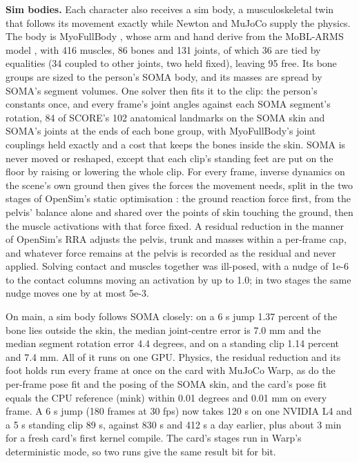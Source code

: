 \textbf{Sim bodies.} Each character also receives a sim body, a musculoskeletal twin that follows its movement exactly while Newton and MuJoCo supply the physics. The body is MyoFullBody \citep{caggiano2022myosuite}, whose arm and hand derive from the MoBL-ARMS model \citep{holzbaur2005upper, saul2015benchmarking}, with 416 muscles, 86 bones and 131 joints, of which 36 are tied by equalities (34 coupled to other joints, two held fixed), leaving 95 free. Its bone groups are sized to the person's SOMA body, and its masses are spread by SOMA's segment volumes. One solver then fits it to the clip: the person's constants once, and every frame's joint angles against each SOMA segment's rotation, 84 of SCORE's 102 anatomical landmarks on the SOMA skin and SOMA's joints at the ends of each bone group, with MyoFullBody's joint couplings held exactly and a cost that keeps the bones inside the skin. SOMA is never moved or reshaped, except that each clip's standing feet are put on the floor by raising or lowering the whole clip. For every frame, inverse dynamics on the scene's own ground then gives the forces the movement needs, split in the two stages of OpenSim's static optimisation \citep{delp2007opensim}: the ground reaction force first, from the pelvis' balance alone and shared over the points of skin touching the ground, then the muscle activations with that force fixed. A residual reduction in the manner of OpenSim's RRA adjusts the pelvis, trunk and masses within a per-frame cap, and whatever force remains at the pelvis is recorded as the residual and never applied. Solving contact and muscles together was ill-posed, with a nudge of 1e-6 to the contact columns moving an activation by up to 1.0; in two stages the same nudge moves one by at most 5e-3.

On main, a sim body follows SOMA closely: on a 6 s jump 1.37 percent of the bone lies outside the skin, the median joint-centre error is 7.0 mm and the median segment rotation error 4.4 degrees, and on a standing clip 1.14 percent and 7.4 mm. All of it runs on one GPU. Physics, the residual reduction and its foot holds run every frame at once on the card with MuJoCo Warp, as do the per-frame pose fit and the posing of the SOMA skin, and the card's pose fit equals the CPU reference (mink) within 0.01 degrees and 0.01 mm on every frame. A 6 s jump (180 frames at 30 fps) now takes 120 s on one NVIDIA L4 and a 5 s standing clip 89 s, against 830 s and 412 s a day earlier, plus about 3 min for a fresh card's first kernel compile. The card's stages run in Warp's deterministic mode, so two runs give the same result bit for bit.

